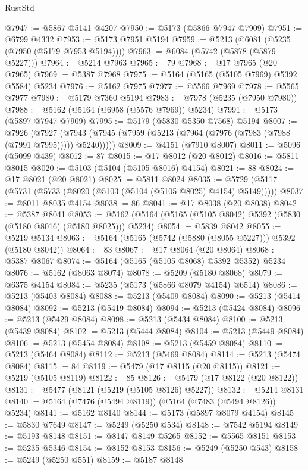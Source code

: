 \begin{lexlean}{RustStd}
\begin{coremodule}
@7947 := @5867 @5141 @4207
@7950 := @5173 (@5866 @7947 @7909)
@7951 := @6799 @4332
@7953 := @5173 @7951 @5194
@7959 := @5213 (@6081 (@5235 (@7950 (@5179 @7953 @5194))))
@7963 := @6084 (@5742 (@5878 (@5879 @5227)))
@7964 := @5214 @7963
@7965 := 79
@7968 := @17 @7965 (@20 @7965)
@7969 := @5387 @7968
@7975 := @5164 (@5165 (@5105 @7969) @5392 @5584) @5234
@7976 := @5162 @7975
@7977 := @5566 @7969
@7978 := @5565 @7977
@7980 := @5179 @7360 @5194
@7983 := @7978 (@5235 (@7950 @7980))
@7988 := @5162 (@5164 (@6958 (@5576 @7969)) @5234)
@7991 := @5173 (@5897 @7947 @7909)
@7995 := @5179 (@5830 @5350 @7568) @5194
@8007 := @7926
    (@7927 (@7943 (@7945 (@7959 (@5213 (@7964 (@7976 (@7983 (@7988 (@7991 @7995))))) @5240)))))
@8009 := @4151 (@7910 @8007)
@8011 := @5096 (@5099 @439)
@8012 := 87
@8015 := @17 @8012 (@20 @8012)
@8016 := @5811 @8015
@8020 := @5103 (@5104 (@5105 @8016) @4154)
@8021 := 88
@8024 := @17 @8021 (@20 @8021)
@8025 := @5811 @8024
@8035 := @5729 (@5117 (@5731 (@5733 (@8020 (@5103 (@5104 (@5105 @8025) @4154) @5149)))))
@8037 := @8011 @8035 @4154
@8038 := 86
@8041 := @17 @8038 (@20 @8038)
@8042 := @5387 @8041
@8053 := @5162 (@5164 (@5165 (@5105 @8042) @5392 (@5830 (@5180 @8016) (@5180 @8025))) @5234)
@8054 := @5839 @8042
@8055 := @5219 @5134
@8063 := @5164 (@5165 (@5742 (@5880 (@8055 @5227))) @5392 (@5180 @8042))
@8064 := 83
@8067 := @17 @8064 (@20 @8064)
@8068 := @5387 @8067
@8074 := @5164 (@5165 (@5105 @8068) @5392 @5352) @5234
@8076 := @5162 (@8063 @8074)
@8078 := @5209 (@5180 @8068)
@8079 := @6375 @4154
@8084 := @5235 (@5173 (@5866 @8079 @4154) @6514)
@8086 := @5213 (@5403 @8084)
@8088 := @5213 (@5409 @8084)
@8090 := @5213 (@5414 @8084)
@8092 := @5213 (@5419 @8084)
@8094 := @5213 (@5424 @8084)
@8096 := @5213 (@5429 @8084)
@8098 := @5213 (@5434 @8084)
@8100 := @5213 (@5439 @8084)
@8102 := @5213 (@5444 @8084)
@8104 := @5213 (@5449 @8084)
@8106 := @5213 (@5454 @8084)
@8108 := @5213 (@5459 @8084)
@8110 := @5213 (@5464 @8084)
@8112 := @5213 (@5469 @8084)
@8114 := @5213 (@5474 @8084)
@8115 := 84
@8119 := @5479 (@17 @8115 (@20 @8115))
@8121 := @5219 (@5105 @8119)
@8122 := 85
@8126 := @5479 (@17 @8122 (@20 @8122))
@8131 := @5477 (@8121 (@5219 (@5105 @8126) @5227))
@8132 := @5214 @8131
@8140 := @5164 (@7476 (@5494 @8119)) (@5164 (@7483 (@5494 @8126)) @5234)
@8141 := @5162 @8140
@8144 := @5173 (@5897 @8079 @4154)
@8145 := @5830 @7649
@8147 := @5249 (@5250 @534)
@8148 := @7542 @5194
@8149 := @5193 @8148
@8151 := @8147 @8149 @5265
@8152 := @5565 @8151
@8153 := @5235 @5346
@8154 := @8152 @8153
@8156 := @5249 (@5250 @543)
@8158 := @5249 (@5250 @551)
@8159 := @5187 @8148

\end{coremodule}
\end{lexlean}
